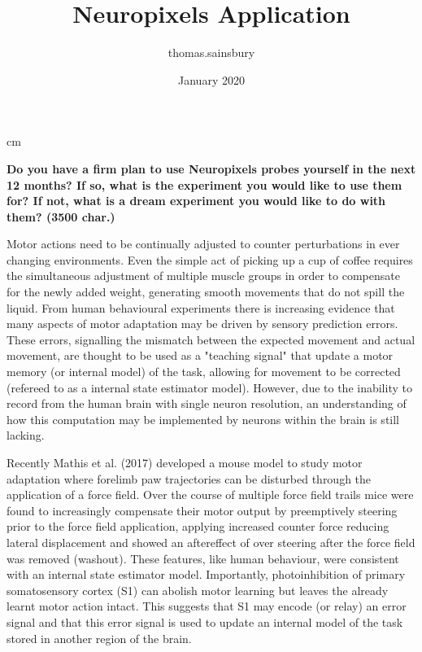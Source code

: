 \documentclass{article}
\title{Neuropixels Application}
\author{thomas.sainsbury }
\date{January 2020}
\begin{document}
\setlength\parindent{0pt}
 cm 
\maketitle

\textbf{Do you have a firm plan to use Neuropixels probes yourself in the next 12 months? If so, what is the experiment you would like to use them for? If not, what is a dream experiment you would like to do with them? (3500 char.) }

Motor actions need to be continually adjusted to counter perturbations in ever changing environments. Even the simple act of picking up a cup of coffee requires the simultaneous adjustment of multiple muscle groups in order to compensate for the newly added weight, generating smooth movements that do not spill the liquid. From human behavioural experiments there is increasing evidence that many aspects of motor adaptation may be driven by sensory prediction errors. These errors, signalling the mismatch between the expected movement and actual movement, are thought to be used as a "teaching signal" that update a motor memory (or internal model) of the task, allowing for movement to be corrected (refereed to as a internal state estimator model). However, due to the inability to record from the human brain with single neuron resolution, an understanding of how this computation may be implemented by neurons within the brain is still lacking.

Recently Mathis et al. (2017) developed a mouse model to study motor adaptation where forelimb paw trajectories can be disturbed through the application of a force field. Over the course of multiple force field trails mice were found to increasingly compensate their motor output by preemptively steering prior to the force field application, applying increased counter force reducing lateral displacement and showed an aftereffect of over steering after the force field was removed (washout). These features, like human behaviour, were consistent with an internal state estimator model. Importantly, photoinhibition of primary somatosensory cortex (S1) can abolish motor learning but leaves the already learnt motor action intact. This suggests that S1 may encode (or relay) an error signal and that this error signal is used to update an internal model of the task stored in another region of the brain.
\end{document}
